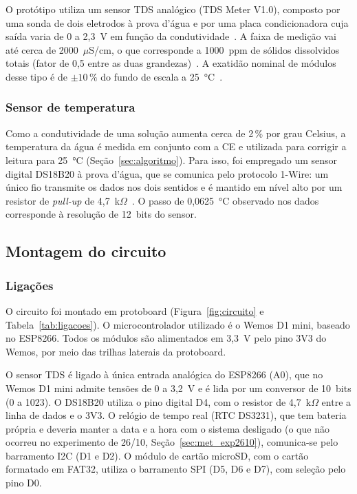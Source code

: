 \documentclass[12pt,a4paper]{article}
\providecommand{\uScm}{\ensuremath{\mu}S/cm}
\begin{document}
O protótipo utiliza um sensor TDS analógico (TDS Meter V1.0), composto por uma sonda de dois eletrodos à prova d'água e por uma placa condicionadora cuja saída varia de 0 a 2,3~V em função da condutividade~\cite{dfrobot_sen0244}. A faixa de medição vai até cerca de 2000~\uScm, o que corresponde a 1000~ppm de sólidos dissolvidos totais (fator de 0,5 entre as duas grandezas)~\cite{dfrobot_sen0244}. A exatidão nominal de módulos desse tipo é de $\pm 10\,\%$ do fundo de escala a 25~°C~\cite{dfrobot_sen0244}.

\subsubsection{Sensor de temperatura}

Como a condutividade de uma solução aumenta cerca de 2\,\% por grau Celsius, a temperatura da água é medida em conjunto com a CE e utilizada para corrigir a leitura para 25~°C (Seção~\ref{sec:algoritmo}). Para isso, foi empregado um sensor digital DS18B20 à prova d'água, que se comunica pelo protocolo 1-Wire: um único fio transmite os dados nos dois sentidos e é mantido em nível alto por um resistor de \emph{pull-up} de 4,7~k$\Omega$~\cite{ds18b20}. O passo de 0,0625~°C observado nos dados corresponde à resolução de 12~bits do sensor.

\subsection{Montagem do circuito}
\label{sec:circuito}

\subsubsection{Ligações}

O circuito foi montado em protoboard (Figura~\ref{fig:circuito} e Tabela~\ref{tab:ligacoes}). O microcontrolador utilizado é o Wemos D1 mini, baseado no ESP8266. Todos os módulos são alimentados em 3,3~V pelo pino 3V3 do Wemos, por meio das trilhas laterais da protoboard.

O sensor TDS é ligado à única entrada analógica do ESP8266 (A0), que no Wemos D1 mini admite tensões de 0 a 3,2~V e é lida por um conversor de 10~bits (0 a 1023). O DS18B20 utiliza o pino digital D4, com o resistor de 4,7~k$\Omega$ entre a linha de dados e o 3V3. O relógio de tempo real (RTC DS3231), que tem bateria própria e deveria manter a data e a hora com o sistema desligado (o que não ocorreu no experimento de 26/10, Seção~\ref{sec:met_exp2610}), comunica-se pelo barramento I2C (D1 e D2). O módulo de cartão microSD, com o cartão formatado em FAT32, utiliza o barramento SPI (D5, D6 e D7), com seleção pelo pino D0.
\end{document}
